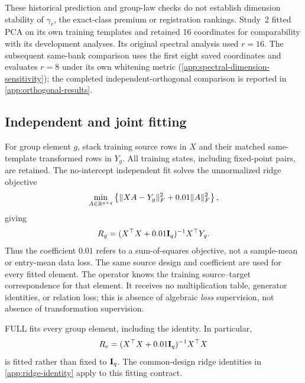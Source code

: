 These historical prediction and group-law checks do not
establish dimension stability of $\gamma_r$, the exact-class
premium or registration rankings.
Study~2 fitted PCA on its own training templates and retained
16 coordinates for comparability with its development analyses.
Its original spectral analysis used $r=16$.
The subsequent same-bank comparison uses the first eight
saved coordinates and evaluates $r=8$ under its own
whitening metric
(\cref{app:spectral-dimension-sensitivity});
the completed independent-orthogonal comparison is reported
in \cref{app:orthogonal-results}.

\subsection{Independent and joint fitting}

For group element $g$, stack training source rows in $X$
and their matched same-template transformed rows in $Y_g$.
All training states, including fixed-point pairs, are retained.
The no-intercept independent fit solves the unnormalized
ridge objective
\[
 \min_{A\in\mathbb{R}^{q\times q}}
 \left\{
 \|XA-Y_g\|_F^2+0.01\|A\|_F^2
 \right\},
\]
giving
\[
 R_g=(X^\top X+0.01\mathbf{I}_q)^{-1}X^\top Y_g.
\]
Thus the coefficient $0.01$ refers to a sum-of-squares
objective, not a sample-mean or entry-mean data loss.
The same source design and coefficient are used for every
fitted element.
The operator knows the training source--target correspondence
for that element.
It receives no multiplication table, generator identities,
or relation loss; this is absence of algebraic \emph{loss}
supervision, not absence of transformation supervision.

FULL fits every group element, including the identity.
In particular,
\[
 R_e=(X^\top X+0.01\mathbf{I}_q)^{-1}X^\top X
\]
is fitted rather than fixed to $\mathbf{I}_q$.
The common-design ridge identities in \cref{app:ridge-identity}
apply to this fitting contract.

